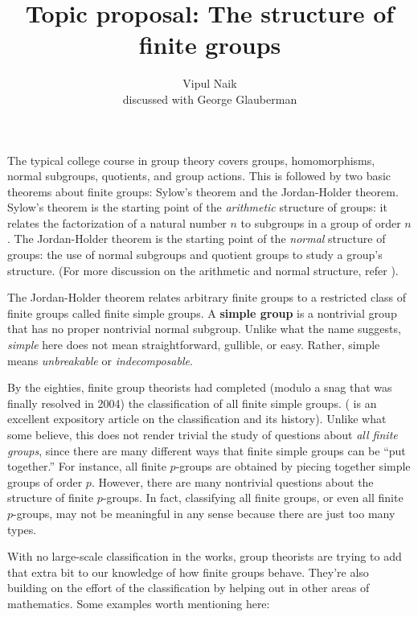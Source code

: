 \documentclass{amsart}
\title{Topic proposal: The structure of finite groups}
\author{Vipul Naik\\discussed with George Glauberman}
\renewcommand{\definedind}[1]{{\bf #1}}
\begin{document}
\maketitle

The typical college course in group theory covers groups,
homomorphisms, normal subgroups, quotients, and group actions. This is
followed by two basic theorems about finite groups: Sylow's theorem
and the Jordan-Holder theorem. Sylow's theorem is the starting point
of the {\em arithmetic} structure of groups: it relates the
factorization of a natural number $n$ to subgroups in a group of order
$n$. The Jordan-Holder theorem is the starting point of the {\em
  normal} structure of groups: the use of normal subgroups and
quotient groups to study a group's structure. (For more discussion on
the arithmetic and normal structure, refer \cite{arithmeticandnormal}).

The Jordan-Holder theorem relates arbitrary finite groups to a
restricted class of finite groups called finite simple groups. A
\definedind{simple group} is a nontrivial group that
has no proper nontrivial normal subgroup. Unlike what the name
suggests, {\em simple} here does not mean straightforward, gullible,
or easy. Rather, simple means {\em unbreakable} or {\em
  indecomposable}.

By the eighties, finite group theorists had completed (modulo a snag
that was finally resolved in 2004) the classification of all finite
simple groups. (\cite{SolomonCFSG} is an excellent expository article
on the classification and its history). Unlike what some believe, this
does not render trivial the study of questions about {\em all finite
  groups}, since there are many different ways that finite
simple groups can be ``put together.'' For instance, all finite
$p$-groups are obtained by piecing together simple groups of order
$p$. However, there are many nontrivial questions about the structure
of finite $p$-groups. In fact, classifying all finite groups, or even
all finite $p$-groups, may not be meaningful in any sense because
there are just too many types.

With no large-scale classification in the works, group theorists are
trying to add that extra bit to our knowledge of how finite groups
behave. They're also building on the effort of the classification by
helping out in other areas of mathematics. Some examples worth
mentioning here:
\end{document}
